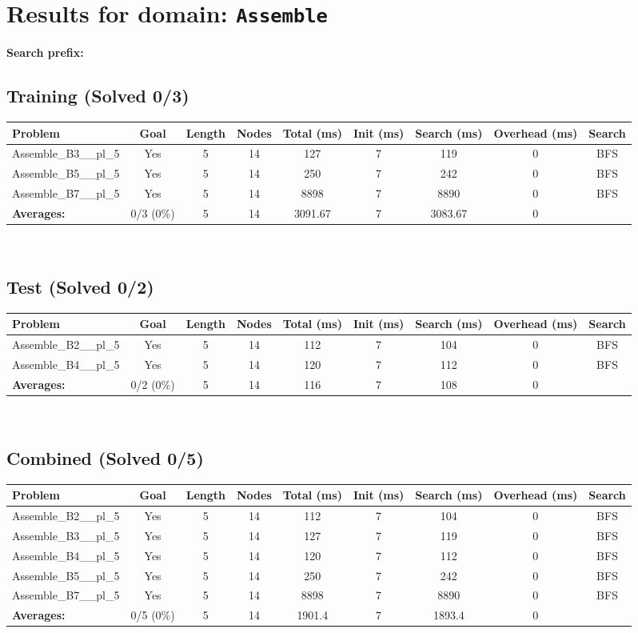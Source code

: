 \documentclass{article}
\begin{document}
\section*{Results for domain: \texttt{Assemble}}
\textbf{Search prefix:} 
\\[0.5cm]
\subsection*{Training (Solved 0/3)}
\begin{tabular}{lcccccccc}
\toprule
Problem & Goal & Length & Nodes & Total (ms) & Init (ms) & Search (ms) & Overhead (ms) & Search \\
\midrule
Assemble\_B3\_\_pl\_5 & Yes & 5 & 14 & 127 & 7 & 119 & 0 & BFS \\
Assemble\_B5\_\_pl\_5 & Yes & 5 & 14 & 250 & 7 & 242 & 0 & BFS \\
Assemble\_B7\_\_pl\_5 & Yes & 5 & 14 & 8898 & 7 & 8890 & 0 & BFS \\
\textbf{Averages:} & 0/3 (0\%) & 5 & 14 & 3091.67 & 7 & 3083.67 & 0 & \\
\bottomrule
\end{tabular}
\\[0.7cm]
\subsection*{Test (Solved 0/2)}
\begin{tabular}{lcccccccc}
\toprule
Problem & Goal & Length & Nodes & Total (ms) & Init (ms) & Search (ms) & Overhead (ms) & Search \\
\midrule
Assemble\_B2\_\_pl\_5 & Yes & 5 & 14 & 112 & 7 & 104 & 0 & BFS \\
Assemble\_B4\_\_pl\_5 & Yes & 5 & 14 & 120 & 7 & 112 & 0 & BFS \\
\textbf{Averages:} & 0/2 (0\%) & 5 & 14 & 116 & 7 & 108 & 0 & \\
\bottomrule
\end{tabular}
\\[0.7cm]
\subsection*{Combined (Solved 0/5)}
\begin{tabular}{lcccccccc}
\toprule
Problem & Goal & Length & Nodes & Total (ms) & Init (ms) & Search (ms) & Overhead (ms) & Search \\
\midrule
Assemble\_B2\_\_pl\_5 & Yes & 5 & 14 & 112 & 7 & 104 & 0 & BFS \\
Assemble\_B3\_\_pl\_5 & Yes & 5 & 14 & 127 & 7 & 119 & 0 & BFS \\
Assemble\_B4\_\_pl\_5 & Yes & 5 & 14 & 120 & 7 & 112 & 0 & BFS \\
Assemble\_B5\_\_pl\_5 & Yes & 5 & 14 & 250 & 7 & 242 & 0 & BFS \\
Assemble\_B7\_\_pl\_5 & Yes & 5 & 14 & 8898 & 7 & 8890 & 0 & BFS \\
\textbf{Averages:} & 0/5 (0\%) & 5 & 14 & 1901.4 & 7 & 1893.4 & 0 & \\
\bottomrule
\end{tabular}
\\[0.7cm]
\end{document}

